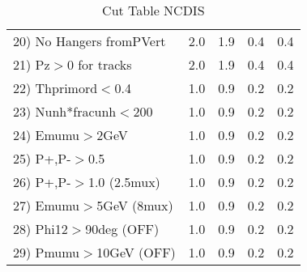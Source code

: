 \begin{table}[h!]
\begin{tabular}{||l||r|r|r|r||}
 20) No Hangers fromPVert &         2.0 &         1.9 &         0.4 &         0.4 \\
 21) Pz$>$0 for tracks    &         2.0 &         1.9 &         0.4 &         0.4 \\
 22) Thprimord$<$0.4      &         1.0 &         0.9 &         0.2 &         0.2 \\
 23) Nunh*fracunh$<$200   &         1.0 &         0.9 &         0.2 &         0.2 \\
 24) Emumu$>$2GeV         &         1.0 &         0.9 &         0.2 &         0.2 \\
 25) P+,P-$>$0.5          &         1.0 &         0.9 &         0.2 &         0.2 \\
 26) P+,P-$>$1.0 (2.5mux) &         1.0 &         0.9 &         0.2 &         0.2 \\
 27) Emumu$>$5GeV  (8mux) &         1.0 &         0.9 &         0.2 &         0.2 \\
 28) Phi12$>$90deg  (OFF) &         1.0 &         0.9 &         0.2 &         0.2 \\
 29) Pmumu$>$10GeV  (OFF) &         1.0 &         0.9 &         0.2 &         0.2 \\
 \hline
 \hline
 \end{tabular}
 \caption{Cut Table  NCDIS  }
 \label{tab-cut_ncdis}
 \end{table}
